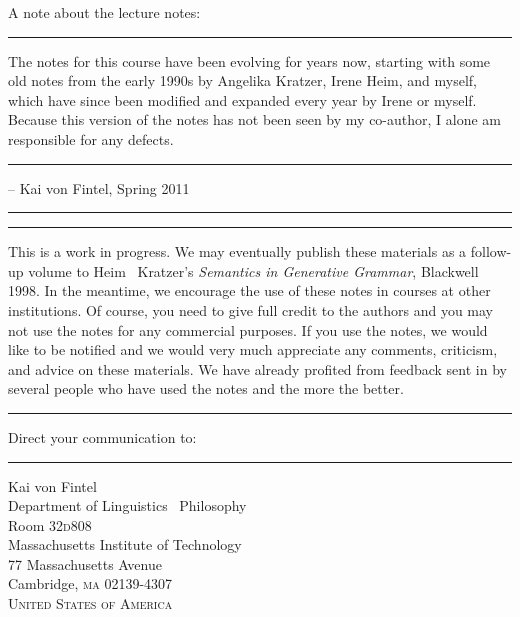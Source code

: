 \frontmatter

\title{}%
\author{\and{}} 
\date{}

\pagestyle{empty}

\maketitle

\clearpage

\null
\vfill \ba 

A note about the lecture notes:

\plainbreak{1} 

The notes for this course have been evolving for years now, starting with some old notes from the early 1990s by Angelika Kratzer, Irene Heim, and myself, which have since been modified and expanded every year by Irene or myself. Because this version of the notes has not been seen by my co-author, I alone am responsible for any defects. 

\plainbreak{1} 

-- Kai von Fintel, Spring 2011

\plainbreak{1}\plainbreak{1}

This is a work in progress. We may eventually publish these materials as a follow-up volume to Heim \amp\ Kratzer's \textit{Semantics in Generative Grammar}, Blackwell 1998. In the meantime, we encourage the use of these notes in courses at other institutions. Of course, you need to give full credit to the authors and you may not use the notes for any commercial purposes. If you use the notes, we would like to be notified and we would very much appreciate any comments, criticism, and advice on these materials. We have already profited from feedback sent in by several people who have used the notes and the more the better.

\plainbreak{1}

Direct your communication to: 

\plainbreak{1} 

Kai von Fintel\\
Department of Linguistics \amp\ Philosophy\\
Room 32\textperiodcentered{}\textsc{d}808\\
Massachusetts Institute of Technology\\
77 Massachusetts Avenue\\
Cambridge, \textsc{ma} 02139-4307\\
\textsc{United States of America} 

